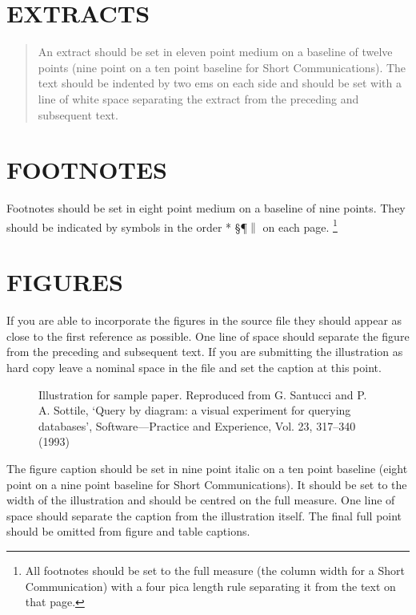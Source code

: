 \section*{EXTRACTS}

\begin{quote}
An extract should be set in eleven point medium on a
baseline of twelve points (nine point on a ten point baseline for Short
Communications). The text should be indented by two ems on
each side and should be set with a line of white space
separating the extract from the preceding and subsequent text.
\end{quote}

\section*{FOOTNOTES}

Footnotes should be set in eight point medium on a
baseline of nine points. They should be indicated by symbols in the order
* \dag \ddag \S \P $\parallel$ on each page.
\footnote{
All footnotes should be set to the full measure (the column width for a Short
Communication) with a four pica length rule separating it from the text on
that page.} 

\section*{FIGURES}

If you are able to incorporate the figures in the
source file they should appear as close to the first reference as
possible. One line of space should separate the figure from the
preceding and subsequent text. If you are submitting the
illustration\cite{SPE}
as hard copy leave a nominal space in the file
and set the caption at this point.

\begin{figure*}[ht]
\begin{center}
\leavevmode
\epsfxsize=27.5pc
\end{center}
\caption{Illustration for sample paper. Reproduced from G. Santucci and P. A.
Sottile, `Query by diagram: a visual experiment for querying databases',
Software---Practice and Experience, Vol. 23, 317--340 (1993)}
\end{figure*}

The figure caption should be set in nine point italic on a ten
point baseline (eight point on a nine point baseline for Short
Communications). It should be set to the width of the illustration
and should be centred on the full measure. One line of space
should separate the caption from the illustration itself. The final full point
should be omitted from figure and table captions.

